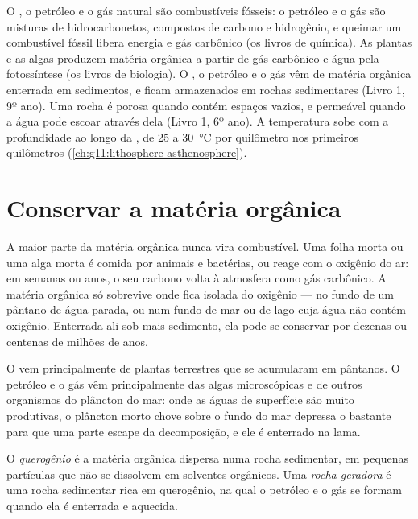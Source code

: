 \begin{recall}
O , o petróleo e o gás natural são combustíveis fósseis: o petróleo e o
gás são misturas de hidrocarbonetos, compostos de carbono e hidrogênio, e
queimar um combustível fóssil libera energia e gás carbônico (os livros de
química). As plantas e as algas produzem matéria orgânica a partir de gás
carbônico e água pela fotossíntese (os livros de biologia). O , o
petróleo e o gás vêm de matéria orgânica enterrada em sedimentos, e ficam
armazenados em rochas sedimentares (Livro 1, 9º ano). Uma rocha é porosa
quando contém espaços vazios, e permeável quando a água pode escoar através
dela (Livro 1, 6º ano). A temperatura sobe com a profundidade ao longo da
, de 25 a \qty{30}{\degreeCelsius} por quilômetro nos primeiros
quilômetros (\cref{ch:g11:lithosphere-asthenosphere}).
\end{recall}

\section{Conservar a matéria orgânica}

A maior parte da matéria orgânica nunca vira combustível. Uma folha morta ou
uma alga morta é comida por animais e bactérias, ou reage com o oxigênio do
ar: em semanas ou anos, o seu carbono volta à atmosfera como gás carbônico.
A matéria orgânica só sobrevive onde fica isolada do oxigênio --- no fundo de
um pântano de água parada, ou num fundo de mar ou de lago cuja água não
contém oxigênio. Enterrada ali sob mais sedimento, ela pode se conservar por
dezenas ou centenas de milhões de anos.

O  vem principalmente de plantas terrestres que se acumularam em
pântanos. O petróleo e o gás vêm principalmente das algas microscópicas e de
outros organismos do plâncton do mar: onde as águas de superfície são muito
produtivas, o plâncton morto chove sobre o fundo do mar depressa o bastante
para que uma parte escape da decomposição, e ele é enterrado na lama.

\begin{definition}\label{def:g11:fossil-fuel-geology:source-rock}
O \emph{querogênio} é a matéria orgânica
dispersa numa rocha sedimentar, em pequenas partículas que não se dissolvem
em solventes orgânicos. Uma \emph{rocha geradora} é
uma rocha sedimentar rica em querogênio, na qual o petróleo e o gás se
formam quando ela é enterrada e aquecida.
\end{definition}

